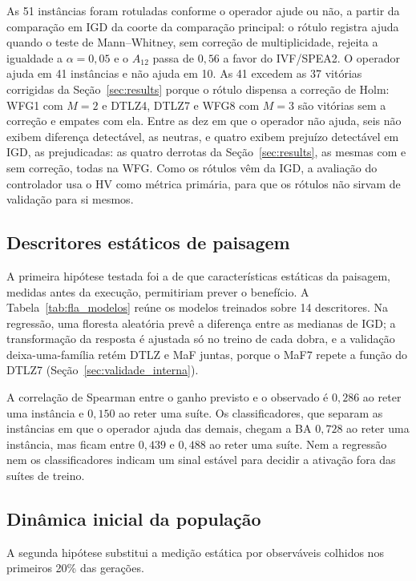 As 51 instâncias foram rotuladas conforme o operador ajude ou não, a partir da comparação em IGD da coorte da comparação principal: o rótulo registra ajuda quando o teste de Mann--Whitney, sem correção de multiplicidade, rejeita a igualdade a $\alpha = 0{,}05$ e o $A_{12}$ passa de $0{,}56$ a favor do IVF/SPEA2. O operador ajuda em 41 instâncias e não ajuda em 10. As 41 excedem as 37 vitórias corrigidas da Seção~\ref{sec:results} porque o rótulo dispensa a correção de Holm: WFG1 com $M = 2$ e DTLZ4, DTLZ7 e WFG8 com $M = 3$ são vitórias sem a correção e empates com ela. Entre as dez em que o operador não ajuda, seis não exibem diferença detectável, as neutras, e quatro exibem prejuízo detectável em IGD, as prejudicadas: as quatro derrotas da Seção~\ref{sec:results}, as mesmas com e sem correção, todas na WFG. Como os rótulos vêm da IGD, a avaliação do controlador usa o HV como métrica primária, para que os rótulos não sirvam de validação para si mesmos.

\subsection{Descritores estáticos de paisagem}

A primeira hipótese testada foi a de que características estáticas da paisagem, medidas antes da execução, permitiriam prever o benefício. A Tabela~\ref{tab:fla_modelos} reúne os modelos treinados sobre 14 descritores. Na regressão, uma floresta aleatória prevê a diferença entre as medianas de IGD; a transformação da resposta é ajustada só no treino de cada dobra, e a validação deixa-uma-família retém DTLZ e MaF juntas, porque o MaF7 repete a função do DTLZ7 (Seção~\ref{sec:validade_interna}).



A correlação de Spearman entre o ganho previsto e o observado é $0{,}286$ ao reter uma instância e $0{,}150$ ao reter uma suíte. Os classificadores, que separam as instâncias em que o operador ajuda das demais, chegam a BA $0{,}728$ ao reter uma instância, mas ficam entre $0{,}439$ e $0{,}488$ ao reter uma suíte. Nem a regressão nem os classificadores indicam um sinal estável para decidir a ativação fora das suítes de treino.

\subsection{Dinâmica inicial da população}

A segunda hipótese substitui a medição estática por observáveis colhidos nos primeiros 20\% das gerações.

